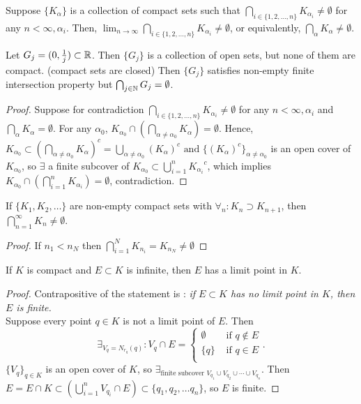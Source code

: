 \begin{thm}[36]
	Suppose $\{K_\alpha\} $ is a collection of compact sets such that $\bigcap_{i \in \{1,2, \ldots, n\} } K_{\alpha_i} \neq \emptyset$ for any $n<\infty, \alpha_i$. Then,
	$\lim_{n\to \infty}{\bigcap_{i \in \{1,2, \ldots ,n\}}K_{\alpha_i}}\neq \emptyset$, or equivalently, $\bigcap_{\alpha} K_{\alpha} \neq \emptyset $.
	\begin{example}
		Let $G_j=(0,\frac{1}{j}) \subset \mathbb{R}$. Then $\{G_j\}$ is a collection of open sets, but none of them are compact. (compact sets are closed)
		Then $\{G_j\}$ satisfies non-empty finite intersection property but $\bigcap_{j \in \mathbb{N} }G_j=\emptyset$.
	\end{example}
	\begin{proof}
		Suppose for contradiction $\bigcap_{i \in \{1,2, \ldots, n\} } K_{\alpha_i} \neq \emptyset$ for any $n<\infty, \alpha_i$ and $\bigcap_{\alpha}K_{\alpha}=\emptyset$.
		For any $\alpha_0$, $K_{\alpha_0} \cap \left( \bigcap_{\alpha\neq \alpha_0}K_{\alpha} \right)=\emptyset$.
		Hence, $K_{\alpha_0} \subset \left( \bigcap_{\alpha\neq \alpha_0}K_{\alpha}\right)^{c}=\bigcup_{\alpha\neq \alpha_0}\left( K_{\alpha}\right)^{c} \text{ and } \{\left( K_{\alpha} \right)^{c}\}_{\alpha\neq \alpha_0}$ is an open cover of $K_{\alpha_0}$, so $\exists$ a finite subcover of $K_{\alpha_0} \subset \bigcup_{i=1}^{n} {K_{\alpha_i}}^{c} $, which implies $K_{\alpha_0} \cap  \left(\bigcap_{i=1}^{n}K_{\alpha_i}   \right)=\emptyset  $, contradiction.
	\end{proof}
	\begin{corollary}
		If $\{K_1,K_2, \ldots \} $ are non-empty compact sets with $\forall_{n}: K_n \supset K_{n+1}$, then $\bigcap_{n=1}^{\infty}K_n \neq \emptyset$.
	\end{corollary}
	\begin{proof}
		If $n_1<n_N$ then $\bigcap_{i=1}^{N}K_{n_i}=K_{n_N}\neq \emptyset $
	\end{proof}

\end{thm}

\begin{thm}[37]
	If $K$ is compact and $E \subset K$ is infinite, then $E$ has a limit point in $K$.
	\begin{proof}
		Contrapositive of the statement is : \textit{if $E \subset K$ has no limit point in $K$, then $E$ is finite.}\\
		Suppose every point $q \in K$ is not a limit point of $E$.
		Then \[\exists_{V_q= N_{r_q}(q)}: V_q \cap E =
			\begin{cases}
				\emptyset & \text{ if $q \not\in E$} \\
				\{q\}     & \text{ if $q \in E$}     \\
			\end{cases}
			.\]
		$\{V_q\}_{q \in K}$ is an open cover of $K$, so $\exists_{\text{finite subcover } V_{q_1} \cup V_{q_2}\cup  \cdots \cup V_{q_n}}$. Then $E=E \cap K \subset \left( \bigcup_{i=1}^{n}{V_{q_i}} \cap  E \right) \subset \{q_1,q_2, \ldots q_n\} $, so $E$ is finite.

	\end{proof}
\end{thm}

